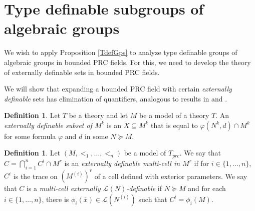 \documentclass[12pt]{article}
\theoremstyle{definition}
\newtheorem{defi}[thm]{Definition}
\theoremstyle{mystyle}
\theoremstyle{remark}
\newcommand{\clos}[2]{#1^{(#2)}}
\begin{document}
%
%



\section{Type definable subgroups of algebraic groups}\label{SAlgebraic}

We wish to apply Proposition \ref{TdefGps} to analyze type
definable groups of algebraic groups in bounded PRC fields. For
this, we need to develop the theory of externally definable sets
in bounded PRC fields.


We will show that expanding a bounded PRC field with certain
\emph{externally definable} sets has elimination of quantifiers,
analogous to results in \cite{BaPo} and \cite{Sh783}.

\begin{defi}
Let $T$ be a theory and let $M$ be a model of a theory $T$. An \emph{externally definable subset of $M^k$}
is an $X \subseteq M^k$ that is equal to $\varphi(N^k, d)\cap M^k$ for some formula $\varphi$ and $d$ in some $N \succeq M$.

\end{defi}

\begin{defi}

Let $(M, <_1, \ldots, <_n)$ be a model of $T_{prc}$.
We say that $C = \bigcap_{i=1}^n C^i \cap M^r$ is an \emph{externally definable multi-cell in $M^r$} if for $i\in \{1,\ldots, n\}$, $C^i$ is the trace on $(\clos{M}{i})^r$ of a cell defined with exterior parameters.
We say that $C$ is a \emph{multi-cell externally $\mathcal{L}(N)$-definable} if $N\succeq M$ and for each $i \in \{1, \ldots, n\}$, there is $\phi_i(\bar{x}) \in \mathcal{L}(\clos{N}{i})$ such that $C^i = \phi_i(M)$.

\end{defi}
\end{document}
